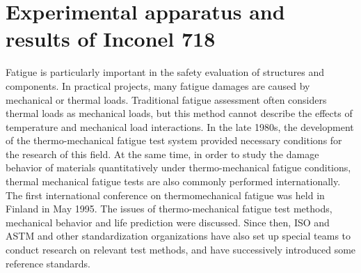 \chapter{Experimental apparatus and results of Inconel 718}



Fatigue is particularly important in the safety evaluation of structures and components. In practical projects, many fatigue damages are caused by mechanical or thermal loads. Traditional fatigue assessment often considers thermal loads as mechanical loads, but this method cannot describe the effects of temperature and mechanical load interactions. In the late 1980s, the development of the thermo-mechanical fatigue test system provided necessary conditions for the research of this field. At the same time, in order to study the damage behavior of materials quantitatively under thermo-mechanical fatigue conditions, thermal mechanical fatigue tests are also commonly performed internationally. The first international conference on thermomechanical fatigue was held in Finland in May 1995. The issues of thermo-mechanical fatigue test methods, mechanical behavior and life prediction were discussed. Since then, ISO and ASTM and other standardization organizations have also set up special teams to conduct research on relevant test methods, and have successively introduced some reference standards.


